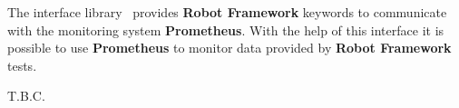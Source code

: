 %



%

The interface library \pkg\ provides \textbf{Robot Framework} keywords to communicate with the monitoring system \textbf{Prometheus}.
With the help of this interface it is possible to use \textbf{Prometheus} to monitor data provided by \textbf{Robot Framework} tests.


T.B.C.
